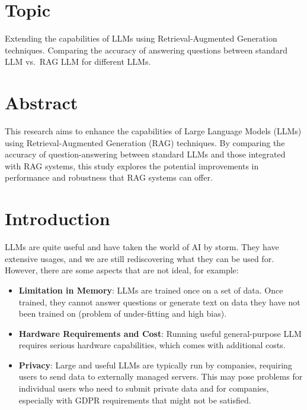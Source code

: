 \documentclass[11pt]{wseas}
\begin{document}
    
    \maketitle
    
    

    
    \tableofcontents

    \newpage

\section{Topic}\label{topic}

Extending the capabilities of LLMs using Retrieval-Augmented Generation
techniques. Comparing the accuracy of answering questions between
standard LLM vs.~RAG LLM for different LLMs.

    \section{Abstract}\label{abstract}

This research aims to enhance the capabilities of Large Language Models
(LLMs) using Retrieval-Augmented Generation (RAG) techniques. By
comparing the accuracy of question-answering between standard LLMs and
those integrated with RAG systems, this study explores the potential
improvements in performance and robustness that RAG systems can offer.

    \section{Introduction}\label{introduction}

LLMs are quite useful and have taken the world of AI by storm. They have
extensive usages, and we are still rediscovering what they can be used
for. However, there are some aspects that are not ideal, for example:

\begin{itemize}
\tightlist
\item
  \textbf{Limitation in Memory}: LLMs are trained once on a set of data.
  Once trained, they cannot answer questions or generate text on data
  they have not been trained on (problem of under-fitting and high
  bias).
\item
  \textbf{Hardware Requirements and Cost}: Running useful
  general-purpose LLM requires serious hardware capabilities, which
  comes with additional costs.
\item
  \textbf{Privacy}: Large and useful LLMs are typically run by
  companies, requiring users to send data to externally managed servers.
  This may pose problems for individual users who need to submit private
  data and for companies, especially with GDPR requirements that might
  not be satisfied.
\end{itemize}
\end{document}
